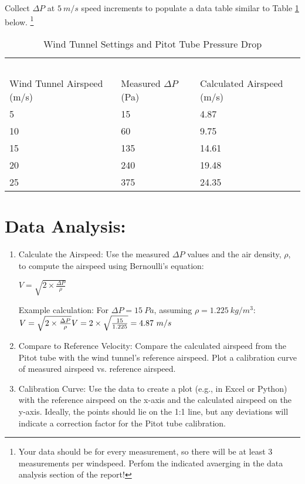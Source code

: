 \documentclass[12pt]{article}
\begin{document}
Collect $\Delta P$ at $5~m/s$ speed increments to populate a data table similar to Table \ref{tab:datatable} below. \footnote{Your data should be for every measurement, so there will be at least 3 measurements per windspeed. Perfom the indicated avaerging in the data analysis section of the report!}
\begin{table}[h!]
\centering
\caption{Wind Tunnel Settings and Pitot Tube Pressure Drop}
\begin{tabular}{p{1.5in}p{1.5in}p{1.5in}}
~&~&~\\
Wind Tunnel Airspeed (m/s)&Measured $\Delta P$ (Pa)&Calculated Airspeed (m/s)\\
\hline
\hline
5&15&4.87\\
10&60&9.75\\
15&135&14.61\\
20&240&19.48\\
25&375&24.35\\
\hline
\end{tabular}
\label{tab:datatable}
\end{table}

\section{Data Analysis:}
\begin{enumerate}
\item Calculate the Airspeed:
Use the measured $\Delta P$ values and the air density, $\rho$, to compute the airspeed using Bernoulli’s equation:

\begin{math}
V=\sqrt{2 \times \frac{\Delta P}{\rho}}
\end{math}

Example calculation: For $\Delta P =15~Pa$, assuming $\rho=1.225~kg/m^3$:\\

\begin{math}
V=\sqrt{2\times \frac{\Delta P}{\rho}}
V=2 \times \sqrt{\frac{15}{1.225}} = 4.87~m/s \\
\end{math}

\item Compare to Reference Velocity:
Compare the calculated airspeed from the Pitot tube with the wind tunnel’s reference airspeed. Plot a calibration curve of measured airspeed vs. reference airspeed.

\item Calibration Curve: Use the data to create a plot (e.g., in Excel or Python) with the reference airspeed on the x-axis and the calculated airspeed on the y-axis. Ideally, the points should lie on the 1:1 line, but any deviations will indicate a correction factor for the Pitot tube calibration.
\end{enumerate}
\end{document}
